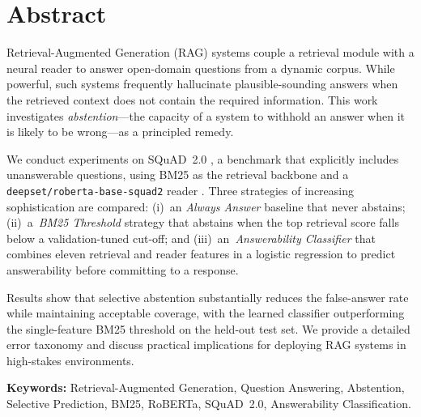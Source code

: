 \documentclass[12pt,a4paper]{report}
\begin{document}
\chapter*{Abstract}

Retrieval-Augmented Generation (RAG) systems couple a retrieval module with a
neural reader to answer open-domain questions from a dynamic corpus. While
powerful, such systems frequently hallucinate plausible-sounding answers when
the retrieved context does not contain the required information. This work
investigates \emph{abstention}—the capacity of a system to withhold an answer
when it is likely to be wrong—as a principled remedy.

We conduct experiments on SQuAD~2.0 \cite{rajpurkar2018squad2}, a benchmark
that explicitly includes unanswerable questions, using BM25
\cite{robertson2009bm25} as the retrieval backbone and a
\texttt{deepset/roberta-base-squad2} reader \cite{liu2019roberta}. Three
strategies of increasing sophistication are compared: (i)~an \emph{Always
Answer} baseline that never abstains; (ii)~a~\emph{BM25 Threshold} strategy
that abstains when the top retrieval score falls below a validation-tuned
cut-off; and (iii)~an~\emph{Answerability Classifier} that combines eleven
retrieval and reader features in a logistic regression to predict
answerability before committing to a response.

Results show that selective abstention substantially reduces the
false-answer rate while maintaining acceptable coverage, with the learned
classifier outperforming the single-feature BM25 threshold on the held-out test
set. We provide a detailed error taxonomy and discuss practical implications
for deploying RAG systems in high-stakes environments.

\bigskip
\noindent\textbf{Keywords:} Retrieval-Augmented Generation, Question Answering,
Abstention, Selective Prediction, BM25, RoBERTa, SQuAD~2.0, Answerability
Classification.

\tableofcontents
\listoffigures
\listoftables











\appendix




\end{document}
